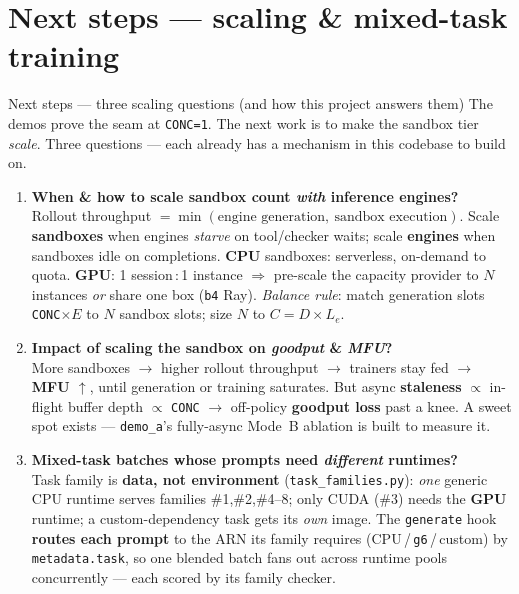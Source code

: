\documentclass[aspectratio=169]{beamer}
\begin{document}
\section{Next steps --- scaling \& mixed-task training}

\begin{frame}{Next steps --- three scaling questions (and how this project answers them)}
  \footnotesize The demos prove the seam at \texttt{CONC=1}. The next work is to make the sandbox tier
  \emph{scale}. Three questions --- each already has a mechanism in this codebase to build on.
  \vspace{0.2em}
  \begin{enumerate}\setlength\itemsep{0.35em}
    \item[\textbf{1}] \textbf{When \& how to scale sandbox count \emph{with} inference engines?}
      \\{\scriptsize Rollout throughput $=\min(\text{engine generation},\ \text{sandbox execution})$. Scale
      \textbf{sandboxes} when engines \emph{starve} on tool/checker waits; scale \textbf{engines} when
      sandboxes idle on completions. \textbf{CPU} sandboxes: serverless, on-demand to quota. \textbf{GPU}:
      1 session\,:\,1 instance $\Rightarrow$ pre-scale the capacity provider to $N$ instances \emph{or}
      share one box (\texttt{b4} Ray). \emph{Balance rule}: match generation slots \texttt{CONC}$\times E$
      to $N$ sandbox slots; size $N$ to $C = D\times L_e$.}
    \item[\textbf{2}] \textbf{Impact of scaling the sandbox on \emph{goodput} \& \emph{MFU}?}
      \\{\scriptsize More sandboxes $\to$ higher rollout throughput $\to$ trainers stay fed $\to$ \textbf{MFU
      $\uparrow$}, until generation or training saturates. But async \textbf{staleness} $\propto$ in-flight
      buffer depth $\propto$ \texttt{CONC} $\to$ off-policy \textbf{goodput loss} past a knee. A sweet spot
      exists --- \texttt{demo\_a}'s fully-async Mode~B ablation is built to measure it.}
    \item[\textbf{3}] \textbf{Mixed-task batches whose prompts need \emph{different} runtimes?}
      \\{\scriptsize Task family is \textbf{data, not environment} (\texttt{task\_families.py}): \emph{one}
      generic CPU runtime serves families \#1,\#2,\#4--8; only CUDA (\#3) needs the \textbf{GPU} runtime;
      a custom-dependency task gets its \emph{own} image. The \texttt{generate} hook \textbf{routes each
      prompt} to the ARN its family requires (CPU\,/\,\texttt{g6}\,/\,custom) by \texttt{metadata.task},
      so one blended batch fans out across runtime pools concurrently --- each scored by its family checker.}
  \end{enumerate}
\end{frame}
\end{document}
